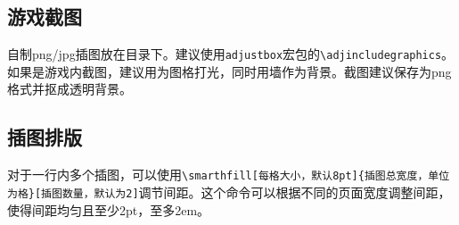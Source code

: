 \subsection{游戏截图}
自制png/jpg插图放在目录下。建议使用\lstinline{adjustbox}宏包的\lstinline{\adjincludegraphics}。如果是游戏内截图，建议用为图格打光，同时用墙作为背景。截图建议保存为png格式并抠成透明背景。

\subsection{插图排版}
对于一行内多个插图，可以使用\lstinline|\smarthfill[每格大小，默认8pt]{插图总宽度，单位为格}[插图数量，默认为2]|调节间距。这个命令可以根据不同的页面宽度调整间距，使得间距均匀且至少2pt，至多2em。

